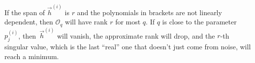 \documentclass{amsart}
\begin{document}
If the span of $\vec h^{(i)}$ is $r$ and the polynomials in brackets are not linearly dependent, then $\mathcal{O}_q$ will have rank $r$ for most $q$.
If $q$ is close to the parameter~$p^{(i)}_j$, then~$\vec h^{(i)}$ will vanish, the approximate rank will drop, and the $r$-th singular value, which is the last ``real'' one that doesn't just come from noise, will reach a minimum.

\end{document}
